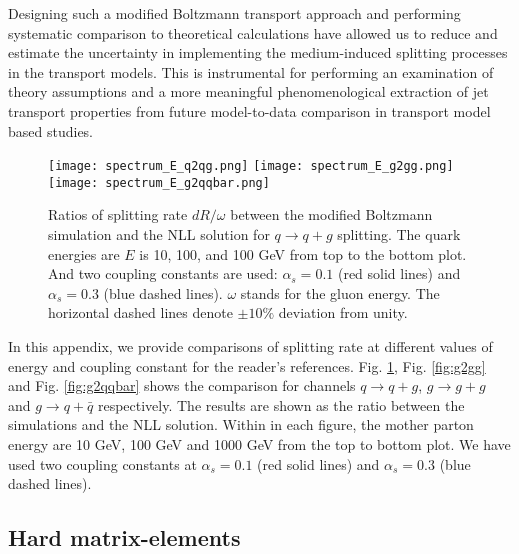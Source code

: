 Designing such a modified Boltzmann transport approach and performing systematic comparison to theoretical calculations have allowed us to reduce and estimate the uncertainty in implementing the medium-induced splitting processes in the transport models. 
This is instrumental for performing an examination of theory assumptions and a more meaningful phenomenological extraction of jet transport properties from future model-to-data comparison in transport model based studies.

\begin{figure}
\texttt{[image: spectrum\_E\_q2qg.png]}
\texttt{[image: spectrum\_E\_g2gg.png]}
\texttt{[image: spectrum\_E\_g2qqbar.png]}
\caption{Ratios of splitting rate $dR/\omega$ between the modified Boltzmann simulation and the NLL solution for $q\rightarrow q+g$ splitting. The quark energies are $E$ is 10, 100, and 100 GeV from top to the bottom plot. 
And two coupling constants are used: $\alpha_s = 0.1$ (red solid lines) and $\alpha_s = 0.3$ (blue dashed lines).
$\omega$ stands for the gluon energy.
The horizontal dashed lines denote $\pm 10\%$ deviation from unity. }
\label{fig:q2qg}
\end{figure}

In this appendix, we provide comparisons of splitting rate at different values of energy and coupling constant for the reader's references.
Fig. \ref{fig:q2qg}, Fig. \ref{fig:g2gg} and Fig. \ref{fig:g2qqbar} shows the comparison for channels $q\rightarrow q+g$, $g\rightarrow g+g$ and $g\rightarrow q+\bar{q}$ respectively.
The results are shown as the ratio between the simulations and the NLL solution.
Within in each figure, the mother parton energy are 10 GeV, 100 GeV and 1000 GeV from the top to bottom plot.
We have used two coupling constants at $\alpha_s = 0.1$ (red solid lines) and $\alpha_s = 0.3$ (blue dashed lines).

\subsection{Hard matrix-elements}

